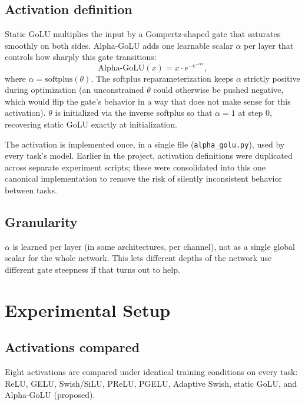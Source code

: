 \documentclass[conference]{IEEEtran}
\begin{document}
\subsection{Activation definition}

Static GoLU multiplies the input by a Gompertz-shaped gate that saturates smoothly on both sides. Alpha-GoLU adds one learnable scalar $\alpha$ per layer that controls how sharply this gate transitions:
\begin{equation}
\text{Alpha-GoLU}(x) = x \cdot e^{-e^{-\alpha x}},
\end{equation}
where $\alpha = \text{softplus}(\theta)$.
The softplus reparameterization keeps $\alpha$ strictly positive during optimization (an unconstrained $\theta$ could otherwise be pushed negative, which would flip the gate's behavior in a way that does not make sense for this activation). $\theta$ is initialized via the inverse softplus so that $\alpha=1$ at step 0, recovering static GoLU exactly at initialization.

The activation is implemented once, in a single file (\texttt{alpha\_golu.py}), used by every task's model. Earlier in the project, activation definitions were duplicated across separate experiment scripts; these were consolidated into this one canonical implementation to remove the risk of silently inconsistent behavior between tasks.

\subsection{Granularity}

$\alpha$ is learned per layer (in some architectures, per channel), not as a single global scalar for the whole network. This lets different depths of the network use different gate steepness if that turns out to help.

\section{Experimental Setup}

\subsection{Activations compared}

Eight activations are compared under identical training conditions on every task: ReLU, GELU, Swish/SiLU, PReLU, PGELU, Adaptive Swish, static GoLU, and Alpha-GoLU (proposed).
\end{document}
